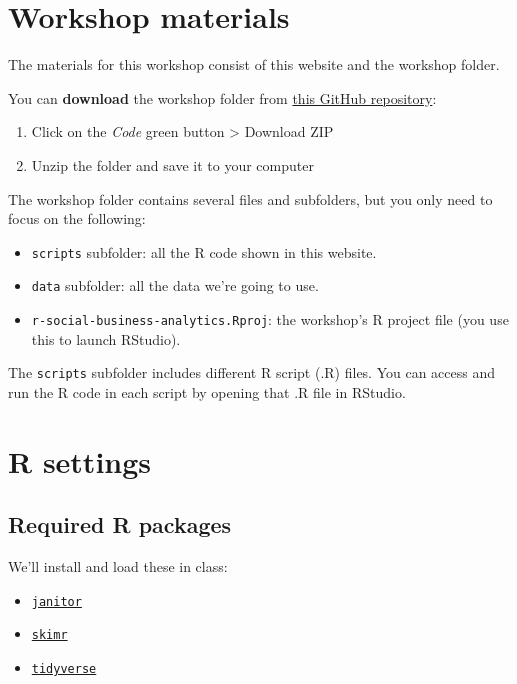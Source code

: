 \documentclass[
]{book}
\providecommand{\tightlist}{%
  \setlength{\itemsep}{0pt}\setlength{\parskip}{0pt}}
\begin{document}
\hypertarget{materials}{%
\section{Workshop materials}\label{materials}}

The materials for this workshop consist of this website and the workshop folder.

You can \textbf{download} the workshop folder from \href{https://github.com/raffaelevacca/r-social-business-analytics}{this GitHub repository}:

\begin{enumerate}
\def\labelenumi{\arabic{enumi}.}
\tightlist
\item
  Click on the \emph{Code} green button \textgreater{} Download ZIP
\item
  Unzip the folder and save it to your computer
\end{enumerate}

The workshop folder contains several files and subfolders, but you only need to focus on the following:

\begin{itemize}
\tightlist
\item
  \texttt{scripts} subfolder: all the R code shown in this website.
\item
  \texttt{data} subfolder: all the data we're going to use.
\item
  \texttt{r-social-business-analytics.Rproj}: the workshop's R project file (you use this to launch RStudio).
\end{itemize}

The \texttt{scripts} subfolder includes different R script (.R) files. You can access and run the R code in each script by opening that .R file in RStudio.

\hypertarget{r-settings}{%
\section{R settings}\label{r-settings}}

\hypertarget{packages}{%
\subsection{Required R packages}\label{packages}}

We'll install and load these in class:

\begin{itemize}
\tightlist
\item
  \href{https://cran.r-project.org/web/packages/janitor/vignettes/janitor.html}{\texttt{janitor}}
\item
  \href{https://cran.r-project.org/web/packages/skimr/vignettes/skimr.html}{\texttt{skimr}}
\item
  \href{https://www.tidyverse.org/}{\texttt{tidyverse}}
\end{itemize}
\end{document}
